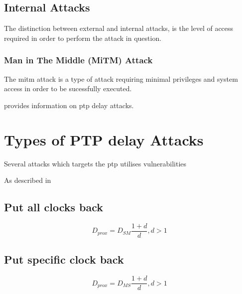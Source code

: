 \subsection{Internal Attacks}
The distinction between external and internal attacks, is the level of access required in order to perform the attack in question.

\subsubsection{Man in The Middle (MiTM) Attack}
The \acrfull{mitm} attack is a type of attack requiring minimal privileges and system access in order to be sucessfully executed.


\cite{itkin2017security} provides information on \acrshort{ptp} delay attacks.





\section{Types of PTP delay Attacks}
Several attacks which targets the \acrlong{ptp}  utilises vulnerabilities 



As described in \cite{ullmann2009delay}
\subsection{Put all clocks back}

\begin{equation} \label{DSM}
    D_{prox}=D_{SM}\frac{1+d}{d},d>1 
\end{equation}
\subsection{Put specific clock back}
\begin{equation} \label{DMS}
    D_{prox}=D_{MS}\frac{1+d}{d},d>1 
\end{equation}

\cite{finkenzeller2022feasible}